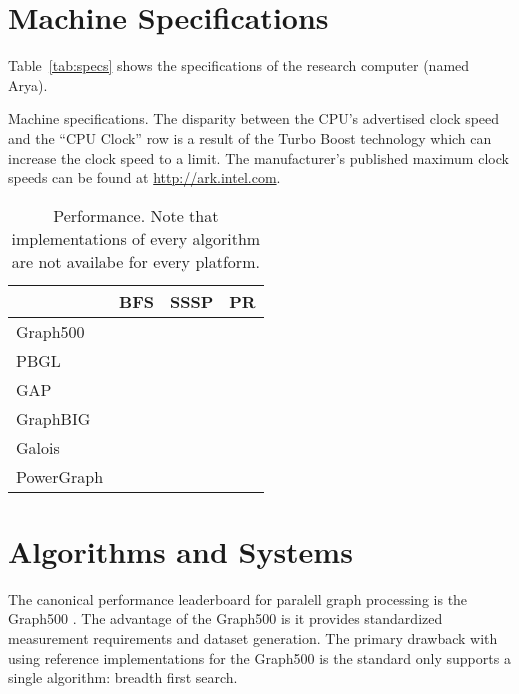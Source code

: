 \documentclass[conference]{IEEEtran}
\begin{document}

\section{Machine Specifications}
Table~\ref{tab:specs} shows the specifications of the research computer (named Arya).

\begin{table}[!htb]
	\centering
	\caption{Machine specifications. The disparity between the CPU's advertised clock speed and the ``CPU Clock'' row is a result of the Turbo Boost technology which can increase the clock speed to a limit. The manufacturer's published maximum clock speeds can be found at \url{http://ark.intel.com}.}
	\label{tab:specs}
\end{table}

\begin{table}[htb]
	\centering
	\begin{tabular}{l|c|c|c}
			& BFS & SSSP & PR \\ \hline
		Graph500 & & & \\ \hline
		PBGL  & & & \\ \hline
		GAP  & & & \\ \hline
		GraphBIG  & & & \\ \hline
		Galois  & & & \\ \hline
		PowerGraph  & & &
	\end{tabular}
	\caption{Performance. Note that implementations of every algorithm are not availabe for every platform.}
	\label{tab:reportcard}
\end{table}

\section{Algorithms and Systems}
The canonical performance leaderboard for paralell graph processing is the Graph500 \cite{Murphy:2010:Graph500}. The advantage of the Graph500 is it provides standardized measurement requirements and dataset generation. The primary drawback with using reference implementations for the Graph500 is the standard only supports a single algorithm: breadth first search.
\end{document}
